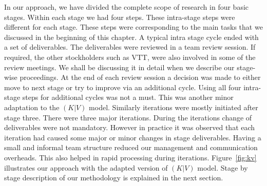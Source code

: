  In our approach, we have divided the complete scope of research in four basic stages. Within each stage we had four steps. These intra-stage steps were different for each stage. These steps were corresponding to the main tasks that we discussed in the beginning of this chapter. A typical intra stage cycle ended with a set of deliverables. The deliverables were reviewed in a team review session. If required, the other stockholders such as VTT, were also involved in some of the review meetings. We shall be discussing it in detail when we describe our stage-wise proceedings. At the end of each review session a decision was made to either move to next stage or try to improve via an additional cycle. Using all four intra-stage steps for additional cycles was not a must. This was another minor adaptation to the \((K|V)\) model. Similarly iterations were mostly initiated after stage three. There were three major iterations. During the iterations change of deliverables were not mandatory. However in practice it was observed that each iteration had caused some major or minor changes in stage deliverables. Having a small and informal team structure reduced our management and communication overheads. This also helped in rapid processing during iterations. Figure~\ref{fig:kv} illustrates our approach with the adapted version of \((K|V)\) model. Stage by stage description of our methodology is explained in the next section.   
